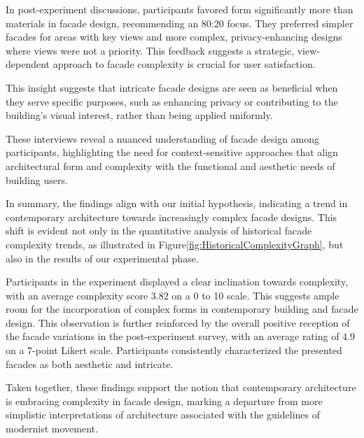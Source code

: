 In post-experiment discussions, participants favored form significantly more than materials in facade design, recommending an 80:20 focus. They preferred simpler facades for areas with key views and more complex, privacy-enhancing designs where views were not a priority. This feedback suggests a strategic, view-dependent approach to facade complexity is crucial for user satisfaction.

This insight suggests that intricate facade designs are seen as beneficial when they serve specific purposes, such as enhancing privacy or contributing to the building’s visual interest, rather than being applied uniformly.

These interviews reveal a nuanced understanding of facade design among participants, highlighting the need for context-sensitive approaches that align architectural form and complexity with the functional and aesthetic needs of building users.


In summary, the findings align with our initial hypothesis, indicating a trend in contemporary architecture towards increasingly complex facade designs.
This shift is evident not only in the quantitative analysis of historical facade complexity trends, as illustrated in Figure\ref{fig:HistoricalComplexityGraph}, but also in the results of our experimental phase.

Participants in the experiment displayed a clear inclination towards complexity, with an average complexity score \(3.82\) on a 0 to 10 scale.
This suggests ample room for the incorporation of complex forms in contemporary building and facade design.
This observation is further reinforced by the overall positive reception of the facade variations in the post-experiment survey, with an average rating of \(4.9\) on a 7-point Likert scale.
Participants consistently characterized the presented facades as both aesthetic and intricate.

Taken together, these findings support the notion that contemporary architecture is embracing complexity in facade design, marking a departure from more simplistic interpretations of architecture associated with the guidelines of modernist movement.



